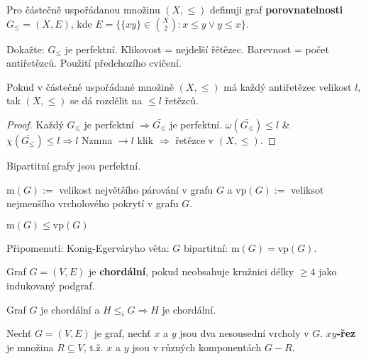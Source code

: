 \begin{definice}
	Pro částečně uspořádanou množinu $(X,\leq)$ definuji graf \textbf{porovnatelnosti} $G_{\leq} = (X,E)$, kde $E = \{\{xy\} \in \binom{X}{2}: x \leq y \lor y \leq x\}$.
\end{definice}

\begin{cvic}
	Dokažte: $G_{\leq}$ je perfektní. Klikovost = nejdelší řětězec. Barevnost = počet antiřetězců. Použití předchozího cvičení.
\end{cvic}

\begin{veta}[Dilworth]
	Pokud v částečně uspořádané množině $(X,\leq)$ má každý antiřetězec velikost $l$, tak $(X, \leq)$ se dá rozdělit na $\leq l$ řetězců.
\end{veta}

\begin{proof}
	Každý $G_{\leq}$ je perfektní $\Rightarrow \bar{G_{\leq}}$ je perfektní. $\omega(\bar{G_{\leq}}) \leq l$ \& $\chi(\bar{G_{\leq}}) \leq l \Rightarrow l$ Nzmna $\to l$ klik $\Rightarrow$ řetězce v $(X, \leq)$.
\end{proof}

\begin{pozor}
	Bipartitní grafy jsou perfektní.
\end{pozor}

\begin{definice}[Značení]
	$\text{m}(G):=$ velikost největšího párování v grafu $G$ a $\text{vp}(G):=$ veliksot nejmenšího vrcholového pokrytí v grafu $G$.
\end{definice}

\begin{pozor}
	$\text{m}(G) \leq \text{vp}(G)$
\end{pozor}

Připomenutí: Konig-Egerváryho věta: $G$ bipartitní: $\text{m}(G) = \text{vp}(G)$.

\begin{definice}
	Graf $G = (V,E)$ je \textbf{chordální}, pokud neobsahuje kružnici délky $\geq 4$ jako indukovaný podgraf.
\end{definice}

\begin{pozor}
	Graf $G$ je chordální a $H \leq_{i} G \Rightarrow H$ je chordální.
\end{pozor}

\begin{definice}
	Nechť $G = (V,E)$ je graf, nechť $x$ a $y$ jsou dva nesousední vrcholy v $G$. \textbf{$xy$-řez} je množina $R \subseteq V$, t.ž. $x$ a $y$ jsou v různých komponentách $G-R$.
\end{definice}

